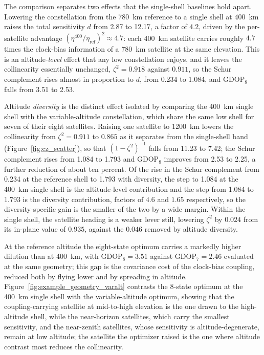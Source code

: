 \documentclass[letterpaper,times]{IONconf-v2}
\theoremstyle{plain}
\theoremstyle{remark}
\begin{document}
The comparison separates two effects that the single-shell baselines hold apart. Lowering the constellation from the 780~km reference to a single shell at 400~km raises the total sensitivity $d$ from 2.87 to 12.17, a factor of $4.2$, driven by the per-satellite advantage $(\eta^{400}/\eta_{\mathrm{ref}})^2 \approx 4.7$: each 400~km satellite carries roughly $4.7$ times the clock-bias information of a 780~km satellite at the same elevation. This is an altitude-\emph{level} effect that any low constellation enjoys, and it leaves the collinearity essentially unchanged, $\zeta^2 = 0.918$ against $0.911$, so the Schur complement rises almost in proportion to $d$, from 0.234 to 1.084, and $\mathrm{GDOP}_8$ falls from 3.51 to 2.53.

Altitude \emph{diversity} is the distinct effect isolated by comparing the 400~km single shell with the variable-altitude constellation, which share the same low shell for seven of their eight satellites. Raising one satellite to 1200~km lowers the collinearity from $\zeta^2 = 0.911$ to $0.865$ as it separates from the single-shell band (Figure~\ref{fig:cz_scatter}), so that $(1-\zeta^2)^{-1}$ falls from 11.23 to 7.42; the Schur complement rises from 1.084 to 1.793 and $\mathrm{GDOP}_8$ improves from 2.53 to 2.25, a further reduction of about ten percent. Of the rise in the Schur complement from 0.234 at the reference shell to 1.793 with diversity, the step to 1.084 at the 400~km single shell is the altitude-level contribution and the step from 1.084 to 1.793 is the diversity contribution, factors of $4.6$ and $1.65$ respectively, so the diversity-specific gain is the smaller of the two by a wide margin. Within the single shell, the satellite heading is a weaker lever still, lowering $\zeta^2$ by $0.024$ from its in-plane value of $0.935$, against the $0.046$ removed by altitude diversity.

At the reference altitude the eight-state optimum carries a markedly higher dilution than at 400~km, with $\mathrm{GDOP}_8 = 3.51$ against $\mathrm{GDOP}_7 = 2.46$ evaluated at the same geometry; this gap is the covariance cost of the clock-bias coupling, reduced both by flying lower and by spreading in altitude. Figure~\ref{fig:example_geometry_varalt} contrasts the 8-state optimum at the 400~km single shell with the variable-altitude optimum, showing that the coupling-carrying satellite at mid-to-high elevation is the one drawn to the high-altitude shell, while the near-horizon satellites, which carry the smallest sensitivity, and the near-zenith satellites, whose sensitivity is altitude-degenerate, remain at low altitude; the satellite the optimizer raised is the one where altitude contrast most reduces the collinearity.
\end{document}
